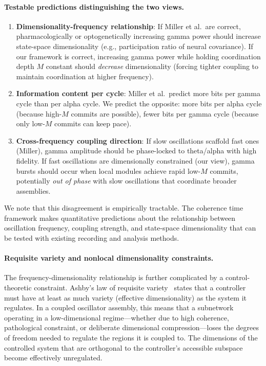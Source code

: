 \documentclass[12pt]{article}
\begin{document}
\paragraph{Testable predictions distinguishing the two views.}
\begin{enumerate}
\item \textbf{Dimensionality-frequency relationship}: If Miller et al.\ are correct, pharmacologically or optogenetically increasing gamma power should increase state-space dimensionality (e.g., participation ratio of neural covariance). If our framework is correct, increasing gamma power while holding coordination depth $M$ constant should \emph{decrease} dimensionality (forcing tighter coupling to maintain coordination at higher frequency).
\item \textbf{Information content per cycle}: Miller et al.\ predict more bits per gamma cycle than per alpha cycle. We predict the opposite: more bits per alpha cycle (because high-$M$ commits are possible), fewer bits per gamma cycle (because only low-$M$ commits can keep pace).
\item \textbf{Cross-frequency coupling direction}: If slow oscillations scaffold fast ones (Miller), gamma amplitude should be phase-locked to theta/alpha with high fidelity. If fast oscillations are dimensionally constrained (our view), gamma bursts should occur when local modules achieve rapid low-$M$ commits, potentially \emph{out of phase} with slow oscillations that coordinate broader assemblies.
\end{enumerate}

We note that this disagreement is empirically tractable. The coherence time framework makes quantitative predictions about the relationship between oscillation frequency, coupling strength, and state-space dimensionality that can be tested with existing recording and analysis methods.

\paragraph{Requisite variety and nonlocal dimensionality constraints.} The frequency-dimensionality relationship is further complicated by a control-theoretic constraint. Ashby's law of requisite variety~\cite{ashby1956} states that a controller must have at least as much variety (effective dimensionality) as the system it regulates. In a coupled oscillator assembly, this means that a subnetwork operating in a low-dimensional regime---whether due to high coherence, pathological constraint, or deliberate dimensional compression---loses the degrees of freedom needed to regulate the regions it is coupled to. The dimensions of the controlled system that are orthogonal to the controller's accessible subspace become effectively unregulated.
\end{document}
